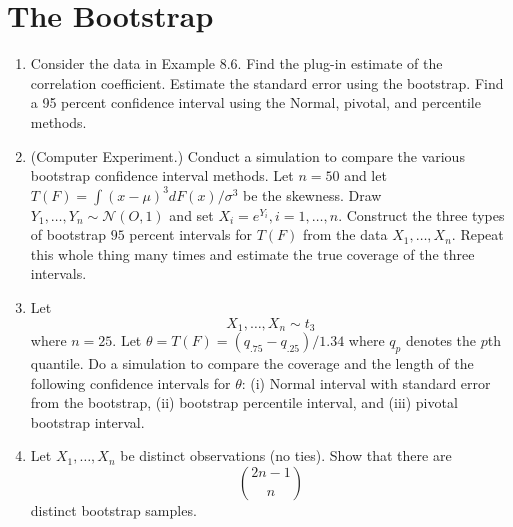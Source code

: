 \documentclass{article}
\begin{document}
\section{The Bootstrap}
\begin{enumerate}
	\item Consider the data in Example 8.6. Find the plug-in estimate of the correlation coefficient. Estimate the standard error using the bootstrap. Find a 95 percent confidence interval using the Normal, pivotal, and percentile methods.
	\item (Computer Experiment.) Conduct a simulation to compare the various bootstrap confidence interval methods. Let $n = 50$ and let $T(F) = \int(x - \mu)^3 dF(x)/\sigma^3$ be the skewness. Draw $Y_1, \dots, Y_n \sim \mathcal{N}(O,1)$ and set $X_i = e^{Y_i}, i = 1, \dots, n$. Construct the three types of bootstrap $95$ percent intervals for $T(F)$ from the data $X_1, \dots, X_n$. Repeat this whole thing many times and estimate the true coverage of the three intervals.
	\item Let
	$$
	X_1, \dots, X_n \sim t_3
	$$
	where $n = 25$. Let $\theta = T(F) = (q_{.75} - q_{.25}) / 1.34$ where $q_p$ denotes the $p$th quantile. Do a simulation to compare the coverage and the length of the following confidence intervals for $\theta$: (i) Normal interval with standard error from the bootstrap, (ii) bootstrap percentile interval, and (iii) pivotal bootstrap interval.
	\item Let $X_1, \dots, X_n$ be distinct observations (no ties). Show that there are
	$$
	\binom{2n - 1}{n}
	$$
	distinct bootstrap samples.


\end{enumerate}
\end{document}
